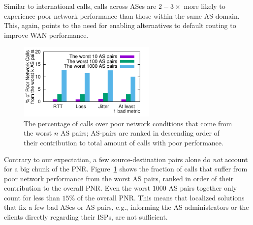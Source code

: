 Similar to international calls, calls across ASes 
are $2-3\times$ more likely to experience poor 
network performance than those within the same 
AS domain. %
This, again, points to the need for enabling alternatives to default routing to improve WAN performance.

\begin{figure}[t!]
\centering
\includegraphics[width=0.6\textwidth]{figures/Via-BadContribution-Top-AsPair.pdf}
\caption{The percentage of calls over poor network 
conditions that come from the worst $n$ AS pairs; 
AS-pairs are ranked in descending order of their 
contribution to total amount of calls with poor performance.}
\label{fig:bad-contribution}
\end{figure}

Contrary to our expectation, a few source-destination pairs 
alone do {\em not} account for a big chunk of the PNR. %
 Figure~\ref{fig:bad-contribution} shows the fraction of 
 calls that suffer from poor network performance from the 
 worst AS pairs, ranked in order of their contribution to the 
 overall PNR. %
Even the worst $1000$ AS pairs together only count for less 
than $15\%$ of the overall PNR. %
This means that localized solutions that fix a few bad ASes 
or AS pairs, e.g., informing the AS administrators or the 
clients directly regarding their ISPs, are not sufficient. 
 
